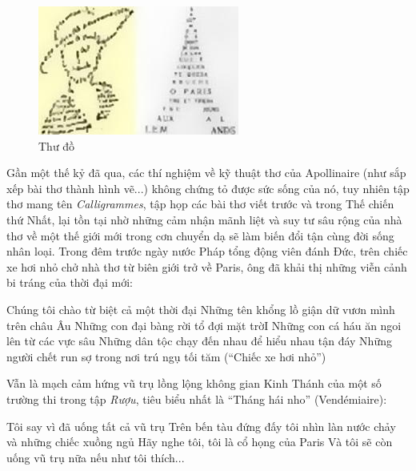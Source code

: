 \documentclass[../main.tex]{subfiles}
\begin{document}
\begin{multicols}{2}
 \begin{figure}
	\centering
	\includegraphics[width=\textwidth]{../img/tho070808_4.jpg}
	\caption{Thư đồ}
\end{figure}
 Gần một thế kỷ đã qua, các thí nghiệm về kỹ thuật thơ của Apollinaire (như sắp xếp bài thơ thành hình vẽ...) không chứng tỏ được sức sống của nó, tuy nhiên tập thơ mang tên \textit{Calligrammes}, tập họp các bài thơ viết trước và trong Thế chiến thứ Nhất, lại tồn tại nhờ những cảm nhận mãnh liệt và suy tư sâu rộng của nhà thơ về một thế giới mới trong cơn chuyển dạ sẽ làm biến đổi tận cùng đời sống nhân loại. Trong đêm trước ngày nước Pháp tổng động viên đánh Đức, trên chiếc xe hơi nhỏ chở nhà thơ từ biên giới trở về Paris, ông đã khải thị những viễn cảnh bi tráng của thời đại mới: 
\begin{blockquote}
        
Chúng tôi chào từ biệt cả một thời đại        
Những tên khổng lồ giận dữ vươn mình trên châu Âu        
Những con đại bàng rời tổ đợi mặt trờI        
Những con cá háu ăn ngoi lên từ các vực sâu        
Những dân tộc chạy đến nhau để hiểu nhau tận đáy        
Những người chết run sợ trong nơi trú ngụ tối tăm         
(“Chiếc xe hơi nhỏ”) 

\end{blockquote}
 
Vẫn là mạch cảm hứng vũ trụ lồng lộng không gian Kinh Thánh của một số trường thi trong tập \textit{Rượu}, tiêu biểu nhất là “Tháng hái nho” (Vendémiaire):  
\begin{blockquote}
        
Tôi say vì đã uống tất cả vũ trụ         
Trên bến tàu đứng đấy tôi nhìn làn nước chảy và những chiếc xuồng ngủ         
Hãy nghe tôi, tôi là cổ họng của Paris         
Và tôi sẽ còn uống vũ trụ nữa nếu như tôi thích...  


\end{blockquote}
\end{multicols}
\end{document}
